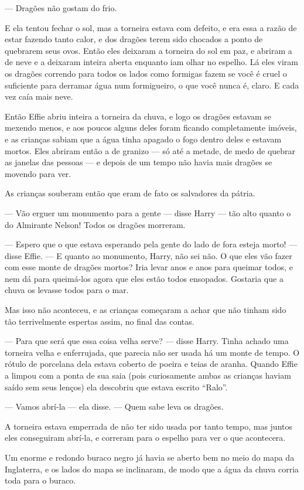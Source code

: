— Dragões não gostam do frio.

E ela tentou fechar o sol, mas a torneira estava com defeito, e era
essa a razão de estar fazendo tanto calor, e dos dragões terem sido
chocados a ponto de quebrarem seus ovos. Então eles deixaram a
torneira do sol em paz, e abriram a de neve e a deixaram inteira
aberta enquanto iam olhar no espelho. Lá eles viram os dragões
correndo para todos os lados como formigas fazem se você é cruel o
suficiente para derramar água num formigueiro, o que você nunca é,
claro. E cada vez caía mais neve.

Então Effie abriu inteira a torneira da chuva, e logo os dragões
estavam se mexendo menos, e aos poucos alguns deles foram ficando
completamente imóveis, e as crianças sabiam que a água tinha apagado
o fogo dentro deles e estavam mortos. Eles abriram então a de granizo
— só até a metade, de medo de quebrar as janelas das pessoas — e
depois de um tempo não havia mais dragões se movendo para ver.

As crianças souberam então que eram de fato os salvadores da pátria.

— Vão erguer um monumento para a gente — disse Harry — tão alto quanto
o do Almirante Nelson! Todos os dragões morreram.

— Espero que o que estava esperando pela gente do lado de fora esteja
morto! — disse Effie. — E quanto ao monumento, Harry, não sei não. O
que eles vão fazer com esse monte de dragões mortos? Iria levar anos
e anos para queimar todos, e nem dá para queimá-los agora que eles
estão todos ensopados. Gostaria que a chuva os levasse todos para o
mar.

Mas isso não aconteceu, e as crianças começaram a achar que não tinham
sido tão terrivelmente espertas assim, no final das contas.

— Para que será que essa coisa velha serve? — disse Harry. Tinha
achado uma torneira velha e enferrujada, que parecia não ser usada há
um monte de tempo. O rótulo de porcelana dela estava coberto de
poeira e teias de aranha. Quando Effie a limpou com a ponta de sua
saia (pois curiosamente ambas as crianças haviam saído sem seus
lenços) ela descobriu que estava escrito “Ralo”.

— Vamos abrí-la — ela disse. — Quem sabe leva os dragões.

A torneira estava emperrada de não ter sido usada por tanto tempo, mas
juntos eles conseguiram abrí-la, e correram para o espelho para ver o
que acontecera.

Um enorme e redondo buraco negro já havia se aberto bem no meio do
mapa da Inglaterra, e os lados do mapa se inclinaram, de modo que a
água da chuva corria toda para o buraco.

